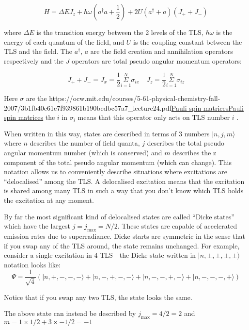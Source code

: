 \documentclass[
]{article}
\let\oldhref\href
\renewcommand{\href}[2]{\ifx#1\urlprefix\oldhref{#1}{#2}\else\uline{\oldhref{#1}{#2}}\fi}
\renewcommand{\[}{\begin{equation}}
\renewcommand{\]}{\end{equation}}
\begin{document}
\[
H =  \Delta E J_{z} + \hbar\omega\left(a^{\dagger}a +\frac{1}{2}\right) + 2U\left( a^{\dagger} + a \right)(J_{+} + J_{-})
\label{eq:dickeHpseudo}
\]

where \(\Delta E\) is the transition energy between the 2 levels of the
TLS, \(\hbar\omega\) is the energy of each quantum of the field, and
\(U\) is the coupling constant between the TLS and the field. The
\(a^{\dagger}\), \(a\) are the field creation and annihilation operators
respectively and the \(J\) operators are total pseudo angular momentum
operators:

\[
J_{+} + J_{-} = J_{x} = \frac{1}{2}\overset{N}{\underset{i=1}{\Sigma}} \sigma_{i x} \,\,\,\,\,\, J_{z} = \frac{1}{2}\overset{N}{\underset{i=1}{\Sigma}} \sigma_{i z}
\]

Here \(\sigma\) are the
\href{https://ocw.mit.edu/courses/5-61-physical-chemistry-fall-2007/3b1fb40c61e7f939861b190bedbc57a7_lecture24.pdf}{Pauli
spin matrices} the \(i\) in \(\sigma_i\) means that this operator only
acts on TLS number \(i\) .

When written in this way, states are described in terms of 3 numbers
\(|n, j, m\rangle\) where \(n\) describes the number of field quanta,
\(j\) describes the total pseudo angular momentum number (which is
conserved) and \(m\) describes the z component of the total pseudo
angular momentum (which can change). This notation allows us to
conveniently describe situations where excitations are ``delocalised''
among the TLS. A delocalised excitation means that the excitation is
shared among many TLS in such a way that you don't know which TLS holds
the excitation at any moment.

By far the most significant kind of delocalised states are called
``Dicke states'' which have the largest \(j=j_{\max} = N/2\). These
states are capable of accelerated emission rates due to superradiance.
Dicke starts are symmetric in the sense that if you swap any of the TLS
around, the state remains unchanged. For example, consider a single
excitation in 4 TLS - the Dicke state written in
\(|n,\pm,\pm, \pm, \pm\rangle\) notation looks like: \[
\Psi = \frac{1}{\sqrt{4}}\left(| n, +, -, -, - \rangle + | n, -, +, -, - \rangle + | n, -, -, +, - \rangle + | n, -, -, -, + \rangle \right)
\]

Notice that if you swap any two TLS, the state looks the same.

The above state can instead be described by \(j_{\max}= 4/2  = 2\) and
\(m = 1\times 1/2 + 3\times -1/2 =-1\)
\end{document}
